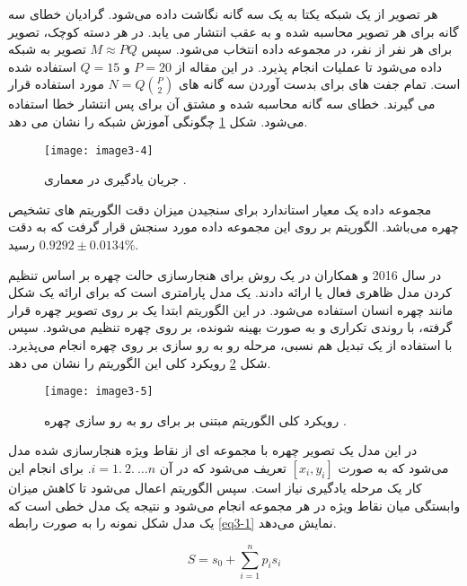 \noindent
هر تصویر از یک شبکه یکتا به یک سه گانه نگاشت داده می‌شود. گرادیان خطای سه گانه برای هر تصویر محاسبه شده و به عقب انتشار می یابد. در هر دسته کوچک،  تصویر برای هر نفر از  نفر، در مجموعه داده انتخاب می‌شود. سپس $M \approx PQ$ تصویر به شبکه داده می‌شود تا عملیات  انجام پذیرد. در این مقاله از $P=20$ و $Q=15$ استفاده شده است. تمام جفت های  برای بدست آوردن سه گانه های $N = Q \binom{P}{2}$ مورد استفاده قرار می گیرند. خطای سه گانه محاسبه شده و مشتق آن برای پس انتشار خطا استفاده می‌شود. شکل \ref{image3-4} چگونگی آموزش شبکه را نشان می دهد.

 \begin{figure}[h]
\centering
  \texttt{[image: image3-4]}
  \caption{جریان یادگیری در معماری  \cite{amos2016openface}.}
  \label{image3-4}
\end{figure}

\noindent
مجموعه داده  یک معیار استاندارد برای سنجیدن میزان دقت الگوریتم های تشخیص چهره می‌باشد. الگوریتم  بر روی این مجموعه داده مورد سنجش قرار گرفت که به دقت
 $0.9292 \pm 0.0134 \%$ 
رسید.

\noindent
در سال 2016  و همکاران در \cite{HAGHIGHAT201623} یک روش برای هنجارسازی حالت چهره بر اساس تنظیم کردن مدل  ظاهری فعال  یا  ارائه دادند.  یک مدل پارامتری است که برای ارائه یک شکل مانند چهره انسان استفاده می‌شود. در این الگوریتم ابتدا یک  بر روی تصویر چهره قرار گرفته، با روندی تکراری و به صورت بهینه شونده، بر روی چهره تنظیم می‌شود. سپس با استفاده از یک تبدیل هم نسبی، مرحله رو به رو سازی بر روی چهره انجام می‌پذیرد. شکل \ref{image3-5} رویکرد کلی این الگوریتم را نشان می دهد. 

\begin{figure}[h]
\centering
  \texttt{[image: image3-5]}
  \caption{رویکرد کلی الگوریتم مبتنی بر  برای رو به رو سازی چهره \cite{HAGHIGHAT201623}.}
  \label{image3-5}
\end{figure}

\noindent
در این مدل یک تصویر چهره با مجموعه ای از نقاط ویژه هنجارسازی شده مدل می‌شود که به صورت $[x_i , y_i]$ تعریف می‌شود که در آن $i=1.\ 2.\ \ldots n $. برای انجام این کار یک مرحله یادگیری نیاز است. سپس الگوریتم  اعمال می‌شود تا کاهش میزان وابستگی میان نقاط ویژه در هر مجموعه انجام می‌شود و نتیجه یک مدل خطی است که یک مدل شکل نمونه را به صورت رابطه \ref{eq3-1} نمایش می‌دهد.

\begin{equation}\label{eq3-1}
S=s_0+\sum_{i=1}^{n}{p_is_i}
\end{equation}


